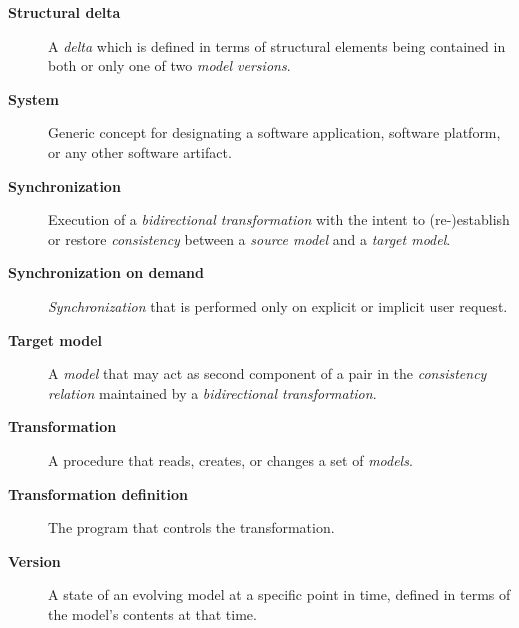 \begin{description}
	\item[\textbf{Structural delta}] A \emph{delta} which is defined in terms of structural elements being contained in both or only one of two \emph{model versions}.
	\item[\textbf{System}] Generic concept for designating a software application, software platform, or any other software artifact.
	\item[\textbf{Synchronization}] Execution of a \emph{bidirectional transformation} with the intent to (re-)establish or restore \emph{consistency} between a \emph{source model} and a \emph{target model}.
	\item[\textbf{Synchronization on demand}] \emph{Synchronization} that is performed only on explicit or implicit user request.
	\item[\textbf{Target model}] A \emph{model} that may act as second component of a pair in the \emph{consistency relation} maintained by a \emph{bidirectional transformation}.
	\item[\textbf{Transformation}] A procedure that reads, creates, or changes a set of \emph{models}.
	\item[\textbf{Transformation definition}] The program that controls the transformation.
	\item[\textbf{Version}] A state of an evolving model at a specific point in time, defined in terms of the model's contents at that time.
\end{description}